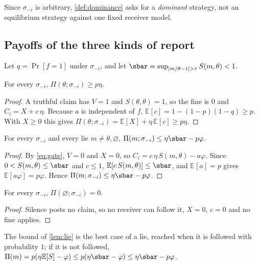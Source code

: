 Since $\sigma_{-i}$ is arbitrary, \cref{def:dominance} asks for a \emph{dominant} strategy, not an equilibrium strategy against one fixed receiver model.

\subsection{Payoffs of the three kinds of report}
Let $q=\Pr[f=1]$ under $\sigma_{-i}$, and let $\sbar=\sup_{|m/\theta-1|>\tau}S(m,\theta)<1$.

\begin{lemma}[Truth]
  \label{lem:truth}
  For every $\sigma_{-i}$, $\Pi(\theta;\sigma_{-i})\ge p\eta$.
\end{lemma}
\begin{proof}
  A truthful claim has $V=1$ and $S(\theta,\theta)=1$, so the fine is $0$ and $C_i=X+c\,\eta$. Because $a$ is independent of $f$, $\mathbb E[c]=1-(1-p)(1-q)\ge p$. With $X\ge0$ this gives $\Pi(\theta;\sigma_{-i})=\mathbb E[X]+\eta\,\mathbb E[c]\ge p\eta$.
\end{proof}

\begin{lemma}[Lie]
  \label{lem:lie}
  For every $\sigma_{-i}$ and every lie $m\neq\theta,\varnothing$, $\Pi(m;\sigma_{-i})\le \eta\sbar-p\varphi$.
\end{lemma}
\begin{proof}
  By \cref{eq:gate}, $V=0$ and $X=0$, so $C_i=c\,\eta\,S(m,\theta)-a\varphi$. Since $0<S(m,\theta)\le\sbar$ and $c\le1$, $\mathbb E[c\,S(m,\theta)]\le\sbar$, and $\mathbb E[a]=p$ gives $\mathbb E[a\varphi]=p\varphi$. Hence $\Pi(m;\sigma_{-i})\le\eta\sbar-p\varphi$.
\end{proof}

\begin{lemma}[Silence]
  \label{lem:silence}
  For every $\sigma_{-i}$, $\Pi(\varnothing;\sigma_{-i})=0$.
\end{lemma}
\begin{proof}
  Silence posts no claim, so no receiver can follow it, $X=0$, $c=0$ and no fine applies.
\end{proof}

The bound of \cref{lem:lie} is the best case of a lie, reached when it is followed with probability $1$; if it is not followed, $\Pi(m)=p(\eta\mathbb E[S]-\varphi)\le p(\eta\sbar-\varphi)\le\eta\sbar-p\varphi$.

